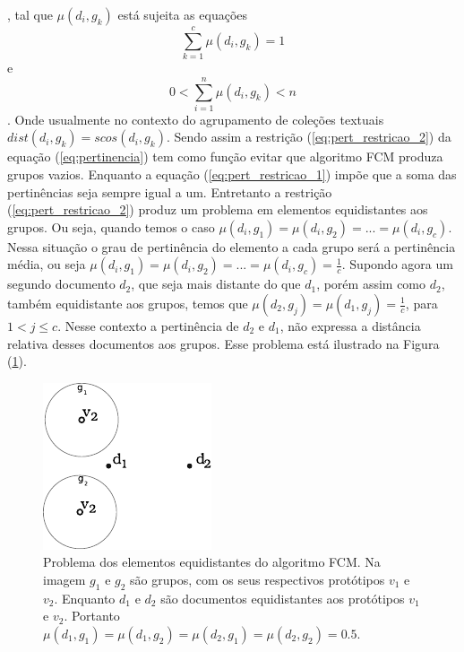 , tal que $\mu(d_i, g_k)$ está sujeita as equações
\begin{equation}
  \sum_{k=1}^c \mu(d_i,g_k) = 1
  \label{eq:pert_restricao_1}
\end{equation}
e
\begin{equation}
  0 < \sum_{i=1}^n \mu(d_i,g_k) < n 
  \label{eq:pert_restricao_2}
\end{equation}
. Onde usualmente no contexto do agrupamento de coleções textuais $dist(d_i,g_k) = scos(d_i,g_k)$.
Sendo assim a restrição (\ref{eq:pert_restricao_2}) da equação 
(\ref{eq:pertinencia}) tem como função evitar que algoritmo FCM produza grupos 
vazios\cite{Nogueira2013}. Enquanto a
equação (\ref{eq:pert_restricao_1}) impõe que a soma das pertinências seja sempre igual a um. 
Entretanto a restrição (\ref{eq:pert_restricao_2}) produz um problema em elementos equidistantes aos grupos. Ou seja, quando temos o caso 
$\mu(d_i, g_1) = \mu(d_i, g_2) = ... = \mu(d_i, g_c)$. Nessa situação o grau de pertinência do 
elemento a cada grupo será a pertinência média, ou seja 
$\mu(d_i, g_1) = \mu(d_i, g_2) = ... = \mu(d_i, g_c) = \frac{1}{c}$. Supondo agora um segundo
documento $d_2$, que seja mais distante do que $d_1$, porém assim como $d_2$, também 
equidistante aos grupos, temos que $\mu(d_2, g_j) = \mu(d_1, g_j) = \frac{1}{c}$, para 
$1 < j \leq c$. Nesse
contexto a pertinência de $d_2$ e $d_1$, não expressa a distância relativa desses documentos aos 
grupos. Esse problema está ilustrado na Figura (\ref{fig:fcm_problem}).

\begin{figure}[!htp]
  \centering
  \includegraphics[width=0.4\columnwidth]{assets/clusters_fcm_problem.pdf}
  \caption{Problema dos elementos equidistantes do algoritmo FCM. Na imagem $g_1$ e $g_2$ são grupos,
    com os seus respectivos protótipos $v_1$ e $v_2$. Enquanto $d_1$ e $d_2$ são documentos 
  equidistantes aos protótipos $v_1$ e $v_2$. Portanto 
$\mu(d_1,g_1) = \mu(d_1,g_2) = \mu(d_2,g_1) = \mu(d_2,g_2) = 0.5$.}
  \label{fig:fcm_problem}
\end{figure}

